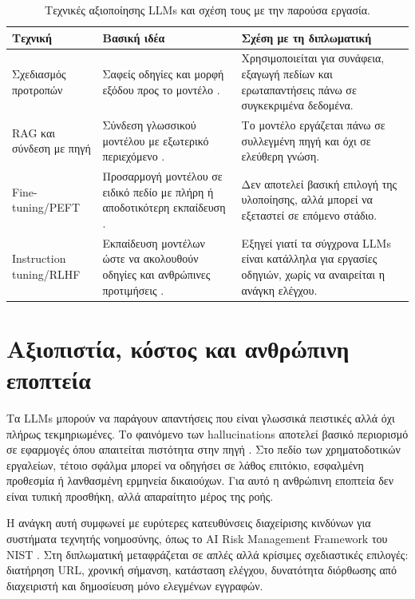 \begin{table}[!htbp]
    \centering
    \caption[Τεχνικές αξιοποίησης LLMs και σχέση με την εργασία]{Τεχνικές αξιοποίησης LLMs και σχέση τους με την παρούσα εργασία.}
    \label{tab:llm-techniques}
    \begin{tabularx}{\textwidth}{L{3.1cm}Y Y}
        \toprule
        \textbf{Τεχνική} & \textbf{Βασική ιδέα} & \textbf{Σχέση με τη διπλωματική} \\
        \midrule
        Σχεδιασμός προτροπών & Σαφείς οδηγίες και μορφή εξόδου προς το μοντέλο \cite{liu2023prompt}. & Χρησιμοποιείται για συνάφεια, εξαγωγή πεδίων και ερωταπαντήσεις πάνω σε συγκεκριμένα δεδομένα. \\
        RAG και σύνδεση με πηγή & Σύνδεση γλωσσικού μοντέλου με εξωτερικό περιεχόμενο \cite{lewis2020rag}. & Το μοντέλο εργάζεται πάνω σε συλλεγμένη πηγή και όχι σε ελεύθερη γνώση. \\
        Fine-tuning/PEFT & Προσαρμογή μοντέλου σε ειδικό πεδίο με πλήρη ή αποδοτικότερη εκπαίδευση \cite{hu2021lora,houlsby2019adapters,lester2021prompt}. & Δεν αποτελεί βασική επιλογή της υλοποίησης, αλλά μπορεί να εξεταστεί σε επόμενο στάδιο. \\
        Instruction tuning/RLHF & Εκπαίδευση μοντέλων ώστε να ακολουθούν οδηγίες και ανθρώπινες προτιμήσεις \cite{christiano2017preferences,ouyang2022training,bai2022helpful}. & Εξηγεί γιατί τα σύγχρονα LLMs είναι κατάλληλα για εργασίες οδηγιών, χωρίς να αναιρείται η ανάγκη ελέγχου. \\
        \bottomrule
    \end{tabularx}
\end{table}

\section{Αξιοπιστία, κόστος και ανθρώπινη εποπτεία}

Τα LLMs μπορούν να παράγουν απαντήσεις που είναι γλωσσικά πειστικές αλλά όχι
πλήρως τεκμηριωμένες. Το φαινόμενο των hallucinations αποτελεί βασικό
περιορισμό σε εφαρμογές όπου απαιτείται πιστότητα στην πηγή
\cite{ji2023hallucination}. Στο πεδίο των χρηματοδοτικών εργαλείων, τέτοιο
σφάλμα μπορεί να οδηγήσει σε λάθος επιτόκιο, εσφαλμένη προθεσμία ή λανθασμένη
ερμηνεία δικαιούχων. Για αυτό η ανθρώπινη εποπτεία δεν είναι τυπική προσθήκη,
αλλά απαραίτητο μέρος της ροής.

Η ανάγκη αυτή συμφωνεί με ευρύτερες κατευθύνσεις διαχείρισης κινδύνων για
συστήματα τεχνητής νοημοσύνης, όπως το AI Risk Management Framework του NIST
\cite{nist_ai_rmf_2023}. Στη διπλωματική μεταφράζεται σε απλές αλλά κρίσιμες
σχεδιαστικές επιλογές: διατήρηση URL, χρονική σήμανση, κατάσταση ελέγχου,
δυνατότητα διόρθωσης από διαχειριστή και δημοσίευση μόνο ελεγμένων εγγραφών.

